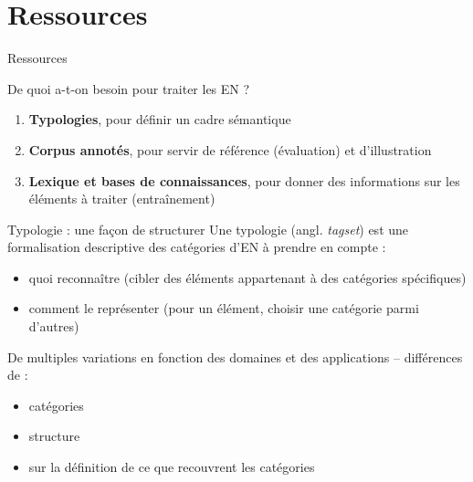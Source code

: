 \documentclass[xetex,xcolor={table,usenames,dvipsnames}]{beamer}
\begin{document}
\section{Ressources}

\begin{frame}{Ressources}
	\begin{block}{\vspace{-0.6cm}}
		\justifying
		De quoi a-t-on besoin pour traiter les \textsc{EN} ?
	\end{block}
	
	\begin{enumerate}
		\item \textcolor{deepblue}{\textbf{Typologies}}, pour définir un cadre sémantique
		\item \textcolor{deepblue}{\textbf{Corpus annotés}}, pour servir de référence (évaluation) et d'illustration
		\item \textcolor{deepblue}{\textbf{Lexique et bases de connaissances}}, pour donner des informations sur les éléments à traiter (entraînement)
	\end{enumerate}
\end{frame}

\begin{frame}{Typologie : une façon de structurer}
	Une typologie (angl. \textit{tagset}) est une \textcolor{deepred}{formalisation descriptive} des catégories d'\textsc{EN} à prendre en compte :
	\begin{itemize}
		\item quoi reconnaître (cibler des éléments appartenant à des catégories spécifiques)
		\item comment le représenter (pour un élément, choisir une catégorie parmi d'autres)
	\end{itemize}
	
	De \textcolor{deepred}{multiples variations} en fonction des domaines et des applications -- différences de :
	\begin{itemize}
		\item catégories
		\item structure
		\item sur la définition de ce que recouvrent les catégories
	\end{itemize}
\end{frame}
\end{document}
